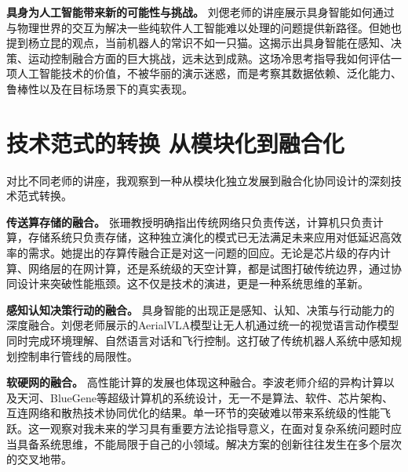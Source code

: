 \textbf{具身为人工智能带来新的可能性与挑战。} 刘偲老师的讲座展示具身智能如何通过与物理世界的交互为解决一些纯软件人工智能难以处理的问题提供新路径。但她也提到杨立昆的观点，当前机器人的常识不如一只猫。这揭示出具身智能在感知、决策、运动控制融合方面的巨大挑战，远未达到成熟。这场冷思考指导我如何评估一项人工智能技术的价值，不被华丽的演示迷惑，而是考察其数据依赖、泛化能力、鲁棒性以及在目标场景下的真实表现。

\section{技术范式的转换 从模块化到融合化}

对比不同老师的讲座，我观察到一种从模块化独立发展到融合化协同设计的深刻技术范式转换。

\textbf{传送算存储的融合。} 张珊教授明确指出传统网络只负责传送，计算机只负责计算，存储系统只负责存储，这种独立演化的模式已无法满足未来应用对低延迟高效率的需求。她提出的存算传融合正是对这一问题的回应。无论是芯片级的存内计算、网络层的在网计算，还是系统级的天空计算，都是试图打破传统边界，通过协同设计来突破性能瓶颈。这不仅是技术的演进，更是一种系统思维的革新。

\textbf{感知认知决策行动的融合。} 具身智能的出现正是感知、认知、决策与行动能力的深度融合。刘偲老师展示的AerialVLA模型让无人机通过统一的视觉语言动作模型同时完成环境理解、自然语言对话和飞行控制。这打破了传统机器人系统中感知规划控制串行管线的局限性。

\textbf{软硬网的融合。} 高性能计算的发展也体现这种融合。李波老师介绍的异构计算以及天河、BlueGene等超级计算机的系统设计，无一不是算法、软件、芯片架构、互连网络和散热技术协同优化的结果。单一环节的突破难以带来系统级的性能飞跃。这一观察对我未来的学习具有重要方法论指导意义，在面对复杂系统问题时应当具备系统思维，不能局限于自己的小领域。解决方案的创新往往发生在多个层次的交叉地带。